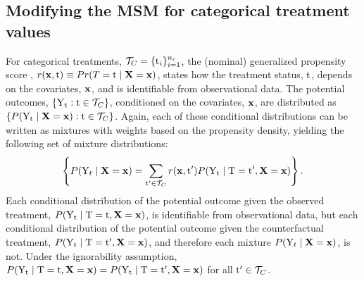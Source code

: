 \subsection{Modifying the MSM for categorical treatment values}
\label{app:cat_msm}
For categorical treatments, $\mathcal{T}_{C} = \{\mathrm{t}_i\}_{i=1}^{n_c}$, the (nominal) generalized propensity score \cite{hirano2004propensity}, $r(\mathbf{x}, \mathrm{t}) \equiv Pr(T=\mathrm{t} \mid \mathbf{X}=\mathbf{x})$, states how the treatment status, $\mathrm{t}$, depends on the covariates, $\mathbf{x}$, and is identifiable from observational data.
The potential outcomes, $\{\mathrm{Y}_{\mathrm{t}}: \mathrm{t} \in \mathcal{T}_{C}\}$, conditioned on the covariates, $\mathbf{x}$, are distributed as $\{P(\mathrm{Y}_{\mathrm{t}} \mid \mathbf{X}=\mathbf{x}): \mathrm{t} \in \mathcal{T}_{C}\}$.
Again, each of these conditional distributions can be written as mixtures with weights based on the propensity density, yielding the following set of mixture distributions:
\begin{equation}
    \left\{
        P(\mathrm{Y}_t \mid \mathbf{X}=\mathbf{x}) = \sum_{\mathrm{t}^{\prime} \in \mathcal{T}_{C}} r(\mathbf{x}, \mathrm{t}^{\prime}) P(\mathrm{Y}_{\mathrm{t}} \mid \mathrm{T}=\mathrm{t}^{\prime}, \mathbf{X}=\mathbf{x})
    \right\}.
\end{equation}
Each conditional distribution of the potential outcome given the observed treatment, $P(\mathrm{Y}_{\mathrm{t}} \mid \mathrm{T}=\mathrm{t}, \mathbf{X}=\mathbf{x})$, is identifiable from observational data, but each conditional distribution of the potential outcome given the counterfactual treatment, $P(\mathrm{Y}_{\mathrm{t}} \mid \mathrm{T}=\mathrm{t}^{\prime}, \mathbf{X}=\mathbf{x})$, and therefore each mixture $P(\mathrm{Y}_t \mid \mathbf{X}=\mathbf{x})$, is not.
Under the ignorability assumption, $P(\mathrm{Y}_{\mathrm{t}} \mid \mathrm{T}=\mathrm{t}, \mathbf{X}=\mathbf{x}) = P(\mathrm{Y}_{\mathrm{t}} \mid \mathrm{T}=\mathrm{t}^{\prime}, \mathbf{X}=\mathbf{x})$ for all $\mathrm{t}^{\prime} \in \mathcal{T}_{C}$.

